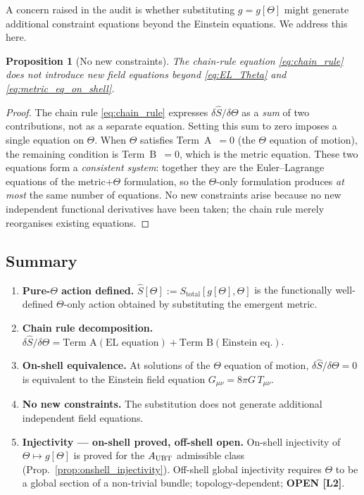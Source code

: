 \documentclass[12pt]{article}
\newtheorem{proposition}[theorem]{Proposition}
\theoremstyle{definition}
\theoremstyle{remark}
\begin{document}
A concern raised in the audit is whether substituting $g=g[\Theta]$ might generate
additional constraint equations beyond the Einstein equations.  We address this here.

\begin{proposition}[No new constraints]
\label{prop:no_new_constraints}
The chain-rule equation \eqref{eq:chain_rule} does not introduce new field equations
beyond \eqref{eq:EL_Theta} and \eqref{eq:metric_eq_on_shell}.
\end{proposition}

\begin{proof}
The chain rule \eqref{eq:chain_rule} expresses $\delta\hat{S}/\delta\Theta$ as a
\emph{sum} of two contributions, not as a separate equation.  Setting this sum to
zero imposes a single equation on $\Theta$.  When $\Theta$ satisfies Term~A~$=0$
(the $\Theta$ equation of motion), the remaining condition is Term~B~$=0$, which
is the metric equation.  These two equations form a \emph{consistent system}:
together they are the Euler--Lagrange equations of the metric+$\Theta$ formulation,
so the $\Theta$-only formulation produces \emph{at most} the same number of equations.
No new constraints arise because no new independent functional derivatives have been
taken; the chain rule merely reorganises existing equations.
\end{proof}

\subsection{Summary}

\begin{enumerate}
  \item \textbf{Pure-$\Theta$ action defined.}
        $\hat{S}[\Theta]:=S_{\text{total}}[g[\Theta],\Theta]$ is the functionally well-defined
        $\Theta$-only action obtained by substituting the emergent metric.
  \item \textbf{Chain rule decomposition.}
        $\delta\hat{S}/\delta\Theta = \text{Term A}(\text{EL equation}) + \text{Term B}(\text{Einstein eq.})$.
  \item \textbf{On-shell equivalence.}
        At solutions of the $\Theta$ equation of motion, $\delta\hat{S}/\delta\Theta=0$
        is equivalent to the Einstein field equation $G_{\mu\nu}=8\pi G\,T_{\mu\nu}$.
  \item \textbf{No new constraints.}
        The substitution does not generate additional independent field equations.
  \item \textbf{Injectivity — on-shell proved, off-shell open.}
        On-shell injectivity of $\Theta\mapsto g[\Theta]$ is proved for the
        $A_{\rm UBT}$ admissible class (Prop.~\ref{prop:onshell_injectivity}).
        Off-shell global injectivity requires $\Theta$ to be a global section of a
        non-trivial bundle; topology-dependent; \textbf{OPEN [L2]}.
\end{enumerate}

\ifdefined\INCLUDEMODE
\else
  
\end{document}
